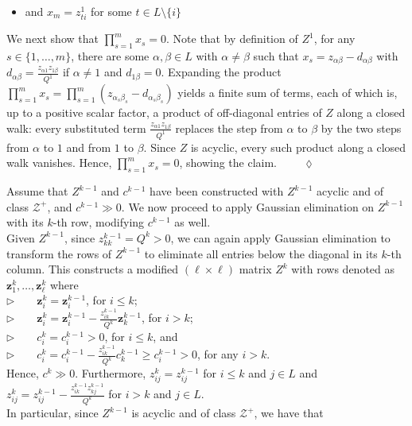 \documentclass[11pt,fleqn]{article}
\begin{document}
\begin{description}
\begin{itemize}
		\item and $x_m = z^1_{ti}$ for some $t \in L \setminus \{ i \}$
	\end{itemize}
	We next show that $\prod^m_{s=1} x_s =0$. Note that by definition of $Z^1$, for any $s\in \{1,\ldots, m\}$, there are some $\alpha , \beta \in L$ with $\alpha \neq \beta$ such that $x_s = z_{\alpha \beta} - d_{\alpha \beta}$ with $d_{\alpha \beta} = \frac{z_{\alpha 1} z_{1 \beta}}{Q^1}$ if $\alpha \neq 1$ and $d_{1 \beta} = 0$. Expanding the product $\prod^m_{s=1} x_s = \prod^m_{s=1} \left( z_{\alpha_s \beta_s} - d_{\alpha_s \beta_s} \right)$ yields a finite sum of terms, each of which is, up to a positive scalar factor, a product of off-diagonal entries of $Z$ along a closed walk: every substituted term $\frac{z_{\alpha 1} z_{1 \beta}}{Q^1}$ replaces the step from $\alpha$ to $\beta$ by the two steps from $\alpha$ to $1$ and from $1$ to $\beta$. Since $Z$ is acyclic, every such product along a closed walk vanishes. Hence, $\prod^m_{s=1} x_s =0$, showing the claim. $\qquad\lozenge$
	\item[Step k with $k \in \{ 2, \ldots , \ell-1 \}$:]
	Assume that $Z^{k-1}$ and $c^{k-1}$ have been constructed with $Z^{k-1}$ acyclic and of class $\mathcal Z^+$, and $c^{k-1} \gg 0$. We now proceed to apply Gaussian elimination on $Z^{k-1}$ with its $k$-th row, modifying $c^{k-1}$ as well. \\
	Given $Z^{k-1}$, since $z^{k-1}_{kk} = Q^k >0$, we can again apply Gaussian elimination to transform the rows of $Z^{k-1}$ to eliminate all entries below the diagonal in its $k$-th column. This constructs a modified $(\ell \times \ell)$ matrix $Z^k$ with rows denoted as $\mathbf{z}^k_1 , \ldots , \mathbf{z}^k_\ell$ where \\[1ex] 
	$\triangleright \qquad \mathbf{z}^k_i = \mathbf{z}^{k-1}_i$, for $i\leqslant k$; \\[1ex] 
	$\triangleright \qquad \mathbf{z}^k_i = \mathbf{z}^{k-1}_i - \frac{z^{k-1}_{ik}}{Q^k} \mathbf{z}^{k-1}_k$, for  $i>k$; \\[1ex] 
	$\triangleright \qquad c^k_i = c^{k-1}_i >0$, for $i\leqslant k$, and \\[1ex] 
	$\triangleright \qquad c^k_i = c^{k-1}_i - \frac{z^{k-1}_{ik}}{Q^k} c^{k-1}_k \geqslant c^{k-1}_i >0$, for any $i>k$. \\[1ex] 
	Hence, $c^k \gg 0$. Furthermore, $z^k_{ij} = z^{k-1}_{ij}$ for   $i \leqslant k$ and $j \in L$ and $z^k_{ij} = z^{k-1}_{ij} - \frac{z^{k-1}_{ik} z^{k-1}_{kj}}{Q^k}$ for   $i>k $ and $j \in L$. \\ In particular, since $Z^{k-1}$ is acyclic and of class $\mathcal Z^+$, we have that

\end{description}
\end{document}
